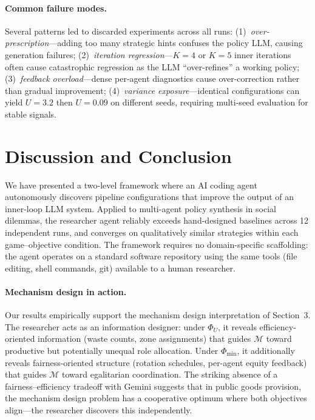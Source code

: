 \documentclass[sigconf,authordraft]{acmart}
\newcommand{\cM}{\mathcal{M}}
\begin{document}
\paragraph{Common failure modes.}
Several patterns led to discarded experiments across all runs: (1)~\emph{over-prescription}---adding too many strategic hints confuses the policy LLM, causing generation failures; (2)~\emph{iteration regression}---$K{=}4$ or $K{=}5$ inner iterations often cause catastrophic regression as the LLM ``over-refines'' a working policy; (3)~\emph{feedback overload}---dense per-agent diagnostics cause over-correction rather than gradual improvement; (4)~\emph{variance exposure}---identical configurations can yield $U{=}3.2$ then $U{=}0.09$ on different seeds, requiring multi-seed evaluation for stable signals.

\section{Discussion and Conclusion}

We have presented a two-level framework where an AI coding agent autonomously discovers pipeline configurations that improve the output of an inner-loop LLM system. Applied to multi-agent policy synthesis in social dilemmas, the researcher agent reliably exceeds hand-designed baselines across 12 independent runs, and converges on qualitatively similar strategies within each game--objective condition. The framework requires no domain-specific scaffolding: the agent operates on a standard software repository using the same tools (file editing, shell commands, git) available to a human researcher.

\paragraph{Mechanism design in action.}
Our results empirically support the mechanism design interpretation of Section~3. The researcher acts as an information designer: under $\Phi_U$, it reveals efficiency-oriented information (waste counts, zone assignments) that guides $\cM$ toward productive but potentially unequal role allocation. Under $\Phi_{\min}$, it additionally reveals fairness-oriented structure (rotation schedules, per-agent equity feedback) that guides $\cM$ toward egalitarian coordination. The striking absence of a fairness--efficiency tradeoff with Gemini suggests that in public goods provision, the mechanism design problem has a cooperative optimum where both objectives align---the researcher discovers this independently.
\end{document}
